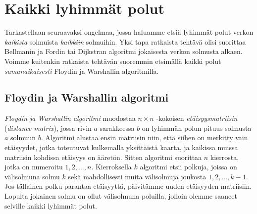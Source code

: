 \section{Kaikki lyhimmät polut}

Tarkastellaan seuraavaksi ongelmaa, jossa
haluamme etsiä lyhimmät polut verkon
\emph{kaikista} solmuista \emph{kaikkiin} solmuihin.
Yksi tapa ratkaista tehtävä olisi suorittaa Bellmanin ja Fordin
tai Dijkstran algoritmi jokaisesta verkon solmusta alkaen.
Voimme kuitenkin ratkaista tehtävän suoremmin
etsimällä kaikki polut \emph{samanaikaisesti}
Floydin ja Warshallin algoritmilla.

\subsection{Floydin ja Warshallin algoritmi}


\emph{Floydin ja Warshallin algoritmi} muodostaa $n \times n$ -kokoisen
\emph{etäisyysmatriisin} (\emph{distance matrix}),
jossa rivin $a$ sarakkeessa $b$ on lyhimmän polun pituus
solmusta $a$ solmuun $b$.
Algoritmi alustaa ensin matriisin niin,
että siihen on merkitty vain etäisyydet,
jotka toteutuvat kulkemalla yksittäistä kaarta,
ja kaikissa muissa matriisin kohdissa etäisyys on ääretön.
Sitten algoritmi suorittaa $n$ kierrosta,
jotka on numeroitu $1,2,\dots,n$.
Kierroksella $k$ algoritmi etsii polkuja, joissa on välisolmuna
solmu $k$ sekä mahdollisesti muita välisolmuja joukosta $1,2,\dots,k-1$.
Jos tällainen polku parantaa etäisyyttä,
päivitämme uuden etäisyyden matriisiin.
Lopulta jokainen solmu on ollut
välisolmuna poluilla, jolloin olemme saaneet selville
kaikki lyhimmät polut.

